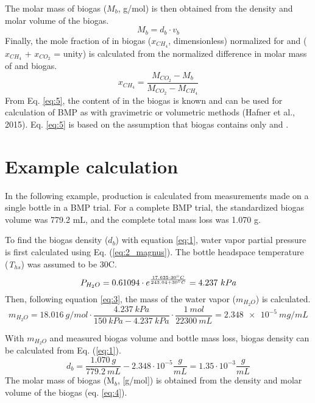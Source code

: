 \documentclass[]{article}
\begin{document}
The molar mass of biogas ($M_b$, g/mol) is then obtained from the density and molar volume of the biogas.
\begin{equation}
  \label{eq:4}
  M_b=d_b \cdot v_b
\end{equation}
Finally, the mole fraction of  in biogas ($x_{CH_4}$, dimensionless) normalized for  and  ($x_{CH_4}$ + $x_{CO_2}$ = unity) is calculated from the normalized difference in molar mass of  and biogas.
\begin{equation}
  \label{eq:5}
  x_{CH_4}=\frac{M_{CO_2}-M_b}{M_{CO_2}-M_{CH_4}}
\end{equation}
From Eq. \ref{eq:5}, the content of  in the biogas is known and can be used for calculation of BMP as with gravimetric or volumetric methods (Hafner et al., 2015). 
Eq. \ref{eq:5} is based on the assumption that biogas contains only  and .

\section{Example calculation} \label{s_example}
In the following example,  production is calculated from measurements made on a single bottle in a BMP trial.
For a complete BMP trial, the standardized biogas volume was 779.2 mL, and the complete total mass loss was 1.070 g.

To find the biogas density ($d_b$) with equation \ref{eq:1}, water vapor partial pressure is first calculated using Eq. (\ref{eq:2_magnus}). 
The bottle headspace temperature (\textit{T}$_{hs}$) was assumed to be 30\degree C.
\begin{equation*}
   P_{H_2O} = 0.61094 \cdot e^{\frac{17.625 \cdot 30 \degree C}{243.04 + 30 \degree C}} = 4.237\ kPa
\end{equation*}
Then, following equation \ref{eq:3}, the mass of the water vapor ($m_{H_2O}$) is calculated.
\begin{equation*}
  m_{H_2O} = \SI{18.016} {g/mol} \cdot \frac{\SI{4.237}{kPa}}{\SI{150}{kPa} - \SI{4.237}{kPa}} \cdot \frac{\SI{1}{mol}}{\SI{22300}{mL}} = \SI{2.348e-5}{mg/mL}
\end{equation*}

With $m_{H_2O}$ and measured biogas volume and bottle mass loss, biogas density can be calculated from Eq. (\ref{eq:1}).
\begin{equation*}
  d_b=\frac{1.070\ g}{779.2\ mL} - 2.348 \cdot 10^{-5} \frac{g}{mL} = 1.35 \cdot 10^{-3} \frac{g}{mL}
\end{equation*}
The molar mass of biogas (M$_b$, [g/mol]) is obtained from the density and molar volume of the biogas (eq. \ref{eq:4}).
\end{document}
